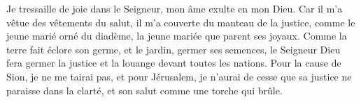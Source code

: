 Je tressaille de joie dans le Seigneur,
	mon âme exulte en mon Dieu.
Car il m’a vêtue des vêtements du salut,
	il m’a couverte du manteau de la justice,
	comme le jeune marié orné du diadème,
	la jeune mariée que parent ses joyaux.
Comme la terre fait éclore son germe,
	et le jardin, germer ses semences,
	le Seigneur Dieu fera germer la justice
	et la louange devant toutes les nations.
Pour la cause de Sion, je ne me tairai pas,
	et pour Jérusalem,
		je n’aurai de cesse que sa justice ne paraisse dans la clarté,
	et son salut comme une torche qui brûle.
